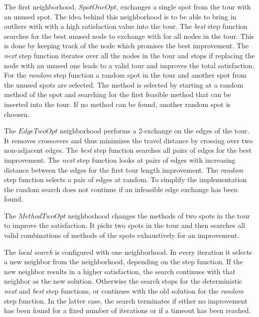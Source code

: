 \documentclass{article}
\begin{document}
The first neighborhood, $SpotOneOpt$, exchanges a single spot from the tour with an unused spot. The idea behind this neighborhood is to
be able to bring in outliers with with a high satisfaction value into the tour.
The \emph{best} step function searches for the best unused node to exchange with for all nodes in the tour.
This is done by keeping track of the node which promises the best improvement. %
The \emph{next} step function iterates over all the nodes in the tour and stops if replacing the node with an unused one leads to a valid
tour and improves the total satisfaction. 
For the \emph{random} step function a random spot in the tour and another spot from the unused spots are selected. 
The method is selected by starting at a random method of the spot and searching for the first feasible method that can be inserted into the
tour. If no method can be found, another random spot is choosen.

The $EdgeTwoOpt$ neighborhood performs a 2-exchange on the edges of the tour. It removes crossovers and thus minimizes the travel distance
by crossing over two non-adjacent edges. 
The \emph{best} step function searches all pairs of edges for the best improvement. The \emph{next} step function looks at pairs of edges
with increasing distance between the edges for the first tour length improvement. The \emph{random} step function selects a pair of edges at
random. To simplify the implementation the random search does not continue if an infeasible edge exchange has been found.

The $MethodTwoOpt$ neighborhood changes the methods of two spots in the tour to improve the satisfaction. It picks two spots in the tour and
then searches all valid combinations of methods of the spots exhaustively for an improvement.





\medskip

The \emph{local search} is configured with one neighborhood. In every iteration it selects a new neighbor from the neighborhood, depending on the
step function. If the new neighbor results in a higher satisfaction, the search continues with that neighbor as the new solution. Otherwise
the search stops for the deterministic \emph{next} and \emph{best} step functions, or continues with the old solution for the \emph{random}
step function. In the latter case, the search terminates if either no improvement has been found for a fixed number of iterations or if a
timeout has been reached.
\end{document}
